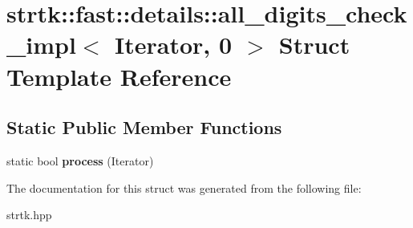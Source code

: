 \hypertarget{structstrtk_1_1fast_1_1details_1_1all__digits__check__impl_3_01Iterator_00_010_01_4}{\section{strtk\-:\-:fast\-:\-:details\-:\-:all\-\_\-digits\-\_\-check\-\_\-impl$<$ Iterator, 0 $>$ Struct Template Reference}
\label{structstrtk_1_1fast_1_1details_1_1all__digits__check__impl_3_01Iterator_00_010_01_4}
}
\subsection*{Static Public Member Functions}
\begin{DoxyCompactItemize}
\item 
\hypertarget{structstrtk_1_1fast_1_1details_1_1all__digits__check__impl_3_01Iterator_00_010_01_4_a2a5376ca099ebc0a7a0fccb4f64fb6a8}{static bool {\bfseries process} (Iterator)}\label{structstrtk_1_1fast_1_1details_1_1all__digits__check__impl_3_01Iterator_00_010_01_4_a2a5376ca099ebc0a7a0fccb4f64fb6a8}

\end{DoxyCompactItemize}


The documentation for this struct was generated from the following file\-:\begin{DoxyCompactItemize}
\item 
strtk.\-hpp\end{DoxyCompactItemize}
